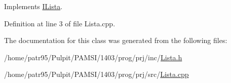 Implements \hyperlink{class_i_lista_a7063d86e7bc765b929ff9d0e0eefa2d1}{I\-Lista}.



Definition at line 3 of file Lista.\-cpp.



The documentation for this class was generated from the following files\-:\begin{DoxyCompactItemize}
\item 
/home/patr95/\-Pulpit/\-P\-A\-M\-S\-I/1403/prog/prj/inc/\hyperlink{_lista_8h}{Lista.\-h}\item 
/home/patr95/\-Pulpit/\-P\-A\-M\-S\-I/1403/prog/prj/src/\hyperlink{_lista_8cpp}{Lista.\-cpp}\end{DoxyCompactItemize}

